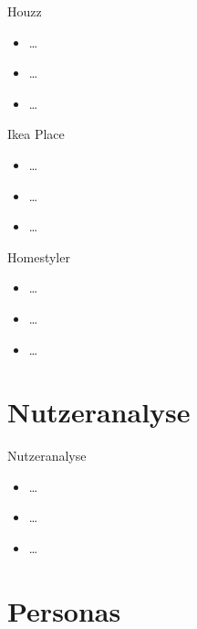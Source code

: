 \documentclass[presentation,bigger,aspectratio=169]{beamer}
\begin{document}
\begin{frame}[label={sec:org8322308}]{Houzz}
\begin{itemize}
\item \ldots{}
\item \ldots{}
\item \ldots{}
\end{itemize}
\end{frame}
\begin{frame}[label={sec:org607d022}]{Ikea Place}
\begin{itemize}
\item \ldots{}
\item \ldots{}
\item \ldots{}
\end{itemize}
\end{frame}
\begin{frame}[label={sec:org19d46aa}]{Homestyler}
\begin{itemize}
\item \ldots{}
\item \ldots{}
\item \ldots{}
\end{itemize}
\end{frame}
\section{Nutzeranalyse}
\label{sec:orgd911b8a}
\begin{frame}[label={sec:orge20105b}]{\vspace{2.2cm}\begin{center}\MakeUppercase{\insertsection}\end{center}}
\end{frame}

\begin{frame}[label={sec:org0bafb6d}]{Nutzeranalyse}
\begin{itemize}
\item \ldots{}
\item \ldots{}
\item \ldots{}
\end{itemize}
\end{frame}
\section{Personas}
\label{sec:org4f09a0c}
\begin{frame}[label={sec:orgc1d7223}]{\vspace{2.2cm}\begin{center}\MakeUppercase{\insertsection}\end{center}}
\end{frame}
\end{document}
